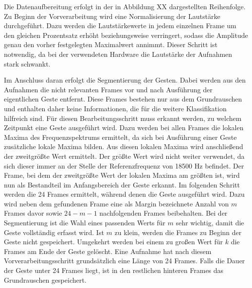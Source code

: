 
Die Datenaufbereitung erfolgt in der in Abbildung XX dargestellten Reihenfolge. 
Zu Beginn der Vorverarbeitung wird eine Normalisierung der 
Lautstärke durchgeführt. Dazu werden die Lautstärkewerte in jedem einzelnen Frame um den gleichen Prozentsatz erhöht beziehungsweise verringert, sodass die Amplitude genau den vorher festgelegten Maximalwert annimmt. Dieser Schritt ist notwendig, da bei der verwendeten Hardware die Lautstärke der Aufnahmen stark schwankt.

Im Anschluss daran erfolgt die Segmentierung der Gesten. Dabei werden aus den Aufnahmen die nicht relevanten Frames vor und nach Ausführung der eigentlichen Geste entfernt. Diese Frames bestehen nur aus dem Grundrauschen und enthalten daher keine Informationen, die für die weitere Klassifikation hilfreich sind.
Für diesen Bearbeitungsschritt muss erkannt werden, zu welchem Zeitpunkt eine Geste ausgeführt wird. Dazu werden bei allen Frames die lokalen Maxima des Frequenzspektrums ermittelt, da sich bei Ausführung einer Geste zusätzliche lokale Maxima bilden.
Aus diesen lokalen Maxima wird anschließend der zweitgrößte Wert ermittelt. Der größte Wert wird nicht weiter verwendet, da sich dieser immer an der Stelle der Referenzfrequenz von 18500 Hz befindet. 
Der Frame, bei dem der zweitgrößte Wert der lokalen Maxima am größten ist, wird nun als Bestandteil im Anfangsbereich der Geste erkannt. 
Im folgenden Schritt werden die 24 Frames ermittelt, während denen die Geste ausgeführt wird. 
Dazu wird neben dem gefundenen Frame eine als Margin bezeichnete Anzahl von $m$ Frames davor sowie $24-m-1$ nachfolgenden Frames beibehalten. Bei der Segmentierung ist die Wahl eines passenden Werts für $m$ sehr wichtig, damit die Geste vollständig erfasst wird. Ist $m$ zu klein, werden die Frames zu Beginn der Geste nicht gespeichert. Umgekehrt werden bei einem zu großen Wert für $k$ die Frames am Ende der Geste gelöscht. Eine Aufnahme hat nach diesem Vorverarbeitungsschritt grundsätzlich eine Länge von 24 Frames. Falls die Dauer der Geste unter 24 Frames liegt, ist in den restlichen hinteren Frames das Grundrauschen gespeichert.

